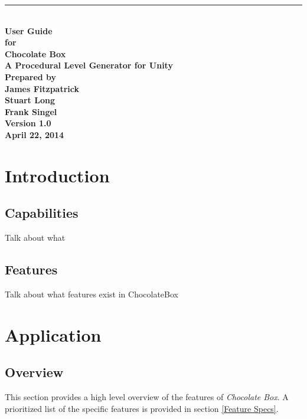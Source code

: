 \documentclass[pdftex,12pt,letter]{article}
\newcommand{\HRule}{\rule{\linewidth}{0.5mm}}
\begin{document}
\begin{titlepage}
\begin{flushright}
\HRule \\[0.4cm]
{ \bfseries
{\huge User Guide\\[1cm]}
{\Large for\\[1cm]}
{\huge Chocolate Box\large\\[.1cm]
A Procedural Level Generator for Unity\\[3cm]}
{\large Prepared by\\[1cm]James Fitzpatrick\\Stuart Long\\Frank Singel\\[2cm]
Version 1.0\\
April 22, 2014\\
}}
\end{flushright}
\end{titlepage}
\FloatBarrier
\newpage
\tableofcontents
\newpage

\section{Introduction}
\subsection{Capabilities}
Talk about what 
\subsection{Features}
Talk about what features exist in ChocolateBox


\section{Application}
\subsection{Overview}
This section provides a high level overview of the features of \textit{Chocolate Box}. A prioritized list of the specific features is provided in section \ref{Feature Specs}.
\end{document}
